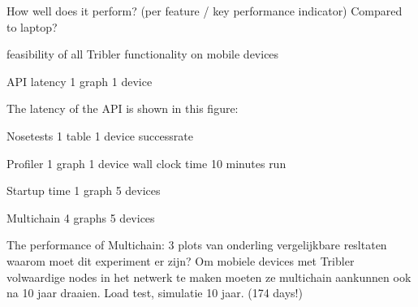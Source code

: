 

How well does it perform? (per feature / key performance indicator)
Compared to laptop?

feasibility of all Tribler functionality on mobile devices






API latency
1 graph
1 device

The latency of the API is shown in this figure:


Nosetests
1 table
1 device
successrate


Profiler
1 graph
1 device
wall clock time
10 minutes run


Startup time
1 graph
5 devices


Multichain
4 graphs
5 devices

The performance of Multichain:
3 plots van onderling vergelijkbare resltaten
waarom moet dit experiment er zijn?
Om mobiele devices met Tribler volwaardige nodes in het netwerk te maken moeten ze multichain aankunnen ook na 10 jaar draaien.
Load test, simulatie 10 jaar. (174 days!)
